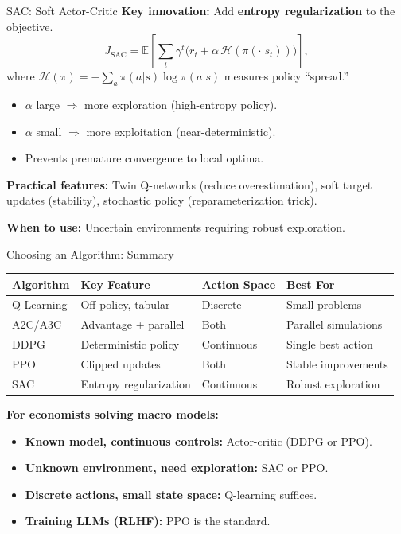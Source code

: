 \documentclass[10pt,english,aspectratio=169]{beamer}
\begin{document}
\begin{frame}{SAC: Soft Actor-Critic}
    \textbf{Key innovation:} Add \textbf{entropy regularization} to the objective.
    \[
      J_{\text{SAC}} = \mathbb{E}\!\left[\sum_t \gamma^t\bigl(r_t + \alpha \,\mathcal{H}(\pi(\cdot|s_t))\bigr)\right],
    \]
    where $\mathcal{H}(\pi) = -\sum_a \pi(a|s)\log\pi(a|s)$ measures policy ``spread.''

    \vspace{0.3cm}
    \begin{itemize}
        \item $\alpha$ large $\Rightarrow$ more exploration (high-entropy policy).
        \item $\alpha$ small $\Rightarrow$ more exploitation (near-deterministic).
        \item Prevents premature convergence to local optima.
    \end{itemize}

    \vspace{0.3cm}
    \textbf{Practical features:} Twin Q-networks (reduce overestimation), soft target updates (stability), stochastic policy (reparameterization trick).

    \vspace{0.2cm}
    \textbf{When to use:} Uncertain environments requiring robust exploration.
\end{frame}


\begin{frame}{Choosing an Algorithm: Summary}
    \small
    \begin{center}
    \begin{tabular}{llll}
        \toprule
        \textbf{Algorithm} & \textbf{Key Feature} & \textbf{Action Space} & \textbf{Best For} \\
        \midrule
        Q-Learning & Off-policy, tabular & Discrete & Small problems \\
        A2C/A3C & Advantage + parallel & Both & Parallel simulations \\
        DDPG & Deterministic policy & Continuous & Single best action \\
        PPO & Clipped updates & Both & Stable improvements \\
        SAC & Entropy regularization & Continuous & Robust exploration \\
        \bottomrule
    \end{tabular}
    \end{center}

    \vspace{0.3cm}
    \normalsize
    \textbf{For economists solving macro models:}
    \begin{itemize}
        \item \textbf{Known model, continuous controls:} Actor-critic (DDPG or PPO).
        \item \textbf{Unknown environment, need exploration:} SAC or PPO.
        \item \textbf{Discrete actions, small state space:} Q-learning suffices.
        \item \textbf{Training LLMs (RLHF):} PPO is the standard.
    \end{itemize}
\end{frame}
\end{document}
